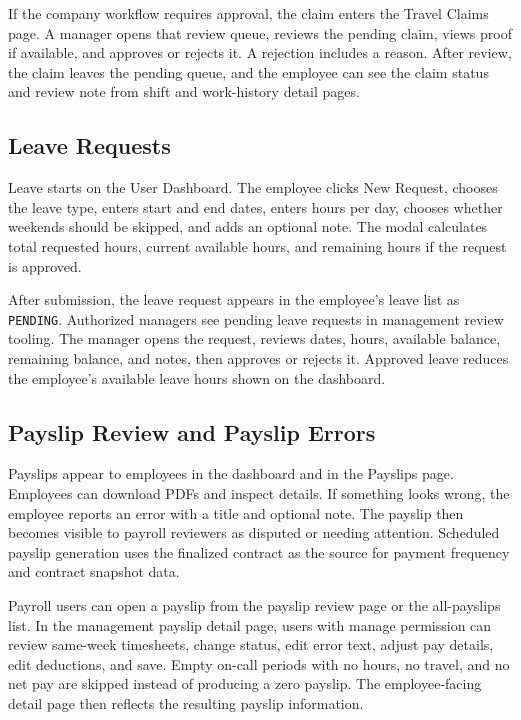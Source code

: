 \documentclass[11pt]{article}
\newcommand{\code}[1]{\nolinkurl{#1}}
\begin{document}
If the company workflow requires approval, the claim enters the Travel Claims page. A manager opens that review queue, reviews the pending claim, views proof if available, and approves or rejects it. A rejection includes a reason. After review, the claim leaves the pending queue, and the employee can see the claim status and review note from shift and work-history detail pages.

\subsection{Leave Requests}

Leave starts on the User Dashboard. The employee clicks New Request, chooses the leave type, enters start and end dates, enters hours per day, chooses whether weekends should be skipped, and adds an optional note. The modal calculates total requested hours, current available hours, and remaining hours if the request is approved.

After submission, the leave request appears in the employee's leave list as \code{PENDING}. Authorized managers see pending leave requests in management review tooling. The manager opens the request, reviews dates, hours, available balance, remaining balance, and notes, then approves or rejects it. Approved leave reduces the employee's available leave hours shown on the dashboard.

\subsection{Payslip Review and Payslip Errors}

Payslips appear to employees in the dashboard and in the Payslips page. Employees can download PDFs and inspect details. If something looks wrong, the employee reports an error with a title and optional note. The payslip then becomes visible to payroll reviewers as disputed or needing attention. Scheduled payslip generation uses the finalized contract as the source for payment frequency and contract snapshot data.

Payroll users can open a payslip from the payslip review page or the all-payslips list. In the management payslip detail page, users with manage permission can review same-week timesheets, change status, edit error text, adjust pay details, edit deductions, and save. Empty on-call periods with no hours, no travel, and no net pay are skipped instead of producing a zero payslip. The employee-facing detail page then reflects the resulting payslip information.
\end{document}
